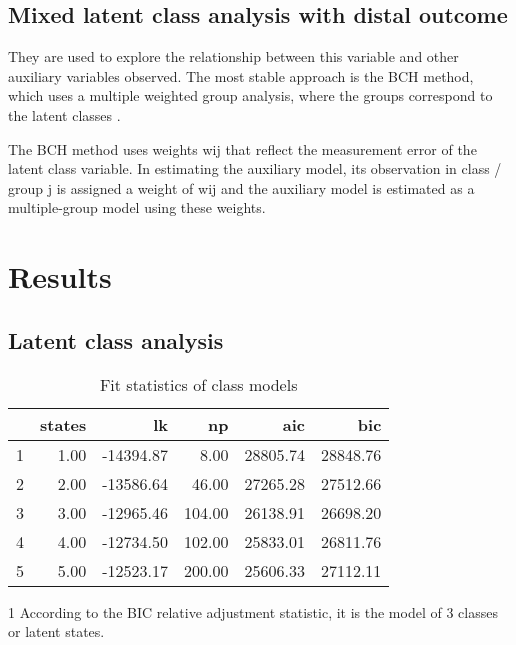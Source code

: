 \subsection{Mixed latent class analysis with distal outcome}

They are used to explore the relationship between this variable and other auxiliary variables observed. The most stable approach is the BCH method, which uses a multiple weighted group analysis, where the groups correspond to the latent classes \parencite{bakk_relating_2014}.
\bigskip

The BCH method uses weights wij that reflect the measurement error of the latent class variable. In estimating the auxiliary model, its observation in class / group j is assigned a weight of wij and the auxiliary model is estimated as a multiple-group model using these weights. 

\section{Results}

\subsection{Latent class analysis}

\begin{table}[H]
\centering
\begin{threeparttable}
\caption{\label{demo-table} Fit statistics of class models}
\begin{tabular}{rrrrrr}
  \hline
 & states & lk & np & aic & bic \\ 
  \hline
1 & 1.00 & -14394.87 & 8.00 & 28805.74 & 28848.76 \\ 
  2 & 2.00 & -13586.64 & 46.00 & 27265.28 & 27512.66 \\ 
  3 & 3.00 & -12965.46 & 104.00 & 26138.91 & 26698.20 \\ 
  4 & 4.00 & -12734.50 & 102.00 & 25833.01 & 26811.76 \\ 
  5 & 5.00 & -12523.17 & 200.00 & 25606.33 & 27112.11 \\ 
   \hline
\end{tabular}
\begin{tablenotes}
    \item[1] According to the BIC relative adjustment statistic, it is the model of 3 classes or latent states.
  \end{tablenotes}
\end{threeparttable}
\end{table}



